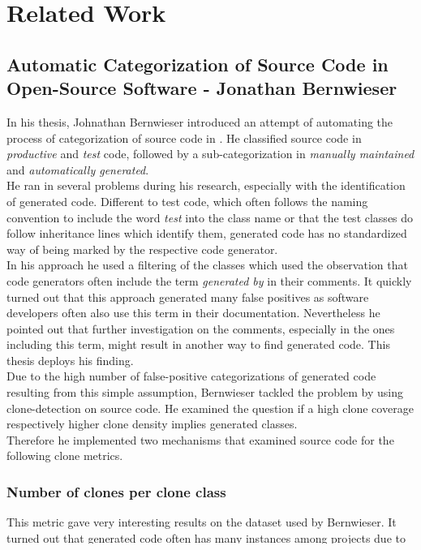 
\chapter{Related Work}\label{chapter:related}

\section{Automatic Categorization of Source Code in Open-Source Software - Jonathan Bernwieser}

In his thesis, Johnathan Bernwieser introduced an attempt of automating the process of categorization of source code in \cite{Bernwieser2014}. He classified source code in \textit{productive} and \textit{test} code, followed by a sub-categorization in \textit{manually maintained} and \textit{automatically generated}.\\
He ran in several problems during his research, especially with the identification of generated code. Different to test code, which often follows the naming convention to include the word \textit{test} into the class name or that the test classes do follow inheritance lines which identify them, generated code has no standardized way of being marked by the respective code generator.\\
In his approach he used a filtering of the classes which used the observation that code generators often include the term \textit{generated by} in their comments. It quickly turned out that this approach generated many false positives as software developers often also use this term in their documentation. Nevertheless he pointed out that further investigation on the comments, especially in the ones including this term, might result in another way to find generated code. This thesis deploys his finding. \\
Due to the high number of false-positive categorizations of generated code resulting from this simple assumption, Bernwieser tackled the problem by using clone-detection on source code. He examined the question if a high clone coverage respectively higher clone density implies generated classes.\\
Therefore he implemented two mechanisms that examined source code for the following clone metrics.

\subsection{Number of clones per clone class}
This metric gave very interesting results on the dataset used by Bernwieser. It turned out that generated code often has many instances among projects due to the usage of templates and routines from which it gets generated and what makes the resulting source code identically between generations. The problem that he ran into was the fact that there exists also generated code with only a small number of instances which resulted in a minimum filter threshold that had to be really low to detect all generated classes, which made it impractical to use.

